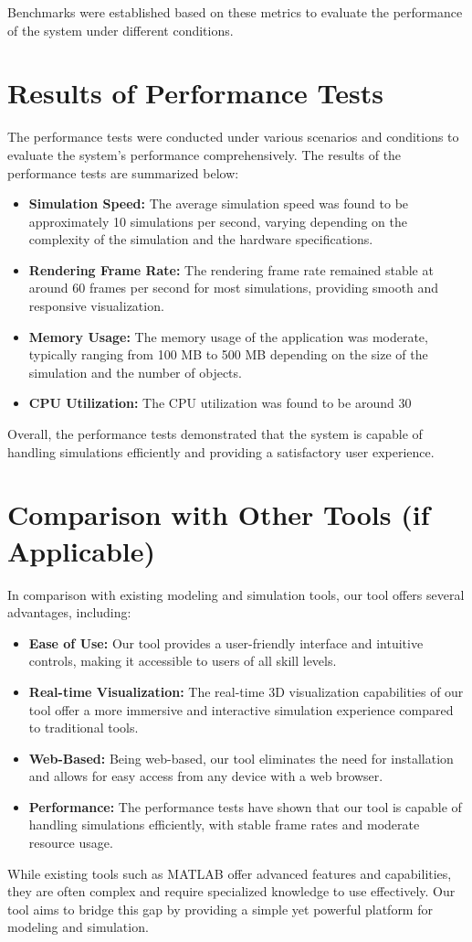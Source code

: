 Benchmarks were established based on these metrics to evaluate the performance of the system under different conditions.

\section{Results of Performance Tests}

The performance tests were conducted under various scenarios and conditions to evaluate the system's performance comprehensively. The results of the performance tests are summarized below:

\begin{itemize}
    \item \textbf{Simulation Speed:} The average simulation speed was found to be approximately 10 simulations per second, varying depending on the complexity of the simulation and the hardware specifications.
    \item \textbf{Rendering Frame Rate:} The rendering frame rate remained stable at around 60 frames per second for most simulations, providing smooth and responsive visualization.
    \item \textbf{Memory Usage:} The memory usage of the application was moderate, typically ranging from 100 MB to 500 MB depending on the size of the simulation and the number of objects.
    \item \textbf{CPU Utilization:} The CPU utilization was found to be around 30%
\end{itemize}

Overall, the performance tests demonstrated that the system is capable of handling simulations efficiently and providing a satisfactory user experience.

\section{Comparison with Other Tools (if Applicable)}

In comparison with existing modeling and simulation tools, our tool offers several advantages, including:

\begin{itemize}
    \item \textbf{Ease of Use:} Our tool provides a user-friendly interface and intuitive controls, making it accessible to users of all skill levels.
    \item \textbf{Real-time Visualization:} The real-time 3D visualization capabilities of our tool offer a more immersive and interactive simulation experience compared to traditional tools.
    \item \textbf{Web-Based:} Being web-based, our tool eliminates the need for installation and allows for easy access from any device with a web browser.
    \item \textbf{Performance:} The performance tests have shown that our tool is capable of handling simulations efficiently, with stable frame rates and moderate resource usage.
\end{itemize}

While existing tools such as MATLAB offer advanced features and capabilities, they are often complex and require specialized knowledge to use effectively. Our tool aims to bridge this gap by providing a simple yet powerful platform for modeling and simulation.
